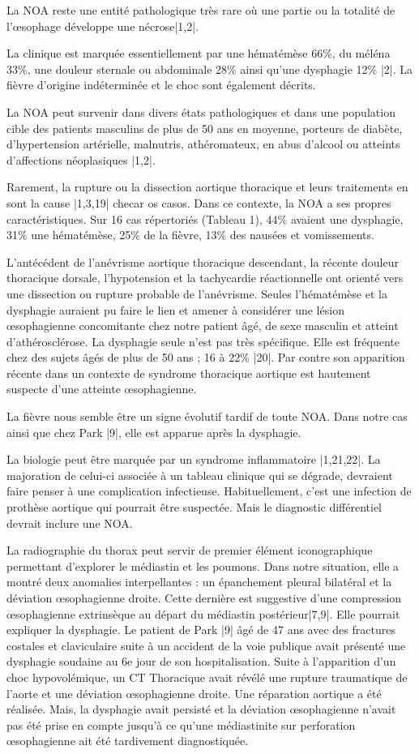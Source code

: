 \documentclass[./tfe.tex]{subfiles}
\begin{document}
La NOA reste une entité pathologique très rare où une partie ou la totalité de l’œsophage développe une nécrose|1,2|.

La clinique est marquée essentiellement par une hématémèse 66\%, du méléna 33\%, une douleur sternale ou abdominale 28\% ainsi qu’une dysphagie 12\% |2|. La fièvre d'origine indéterminée et le choc sont également décrits.

La NOA peut survenir dans divers états pathologiques et dans une population cible des patients masculins de plus de 50 ans en moyenne, porteurs de diabète, d’hypertension artérielle, malnutris, athéromateux, en abus d’alcool ou atteints d’affections néoplasiques |1,2|.

Rarement, la rupture ou la dissection aortique thoracique et leurs traitements en sont la cause |1,3,19|  checar os casos.
Dans ce contexte, la NOA a ses propres caractéristiques. Sur 16 cas répertoriés (Tableau 1), 44\% avaient une dysphagie, 31\% une hématémèse, 25\% de la fièvre, 13\% des nausées et vomissements.

L’antécédent de l’anévrisme aortique thoracique descendant, la récente douleur thoracique dorsale, l’hypotension et la tachycardie réactionnelle ont orienté vers une dissection ou rupture probable de l’anévrisme. Seules l’hématémèse et la dysphagie auraient pu faire le lien et amener à considérer une lésion œsophagienne concomitante chez notre patient âgé, de sexe masculin et atteint d’athérosclérose. La dysphagie seule n’est pas très spécifique. Elle est fréquente chez des sujets âgés de plus de 50 ans ; 16 à 22\% |20|. Par contre son apparition récente dans un contexte de syndrome thoracique aortique est hautement suspecte d’une atteinte œsophagienne.

La fièvre nous semble être un signe évolutif tardif de toute NOA. Dans notre cas ainsi que chez Park |9|, elle est apparue après la dysphagie.

La biologie peut être marquée par un syndrome inflammatoire |1,21,22|. La majoration de celui-ci associée à un tableau clinique qui se dégrade, devraient faire penser à une complication infectieuse. Habituellement, c’est une infection de prothèse aortique qui pourrait être suspectée. Mais le diagnostic différentiel devrait inclure une NOA.

La radiographie du thorax peut servir de premier élément iconographique permettant d’explorer le médiastin et les poumons. Dans notre situation, elle a montré deux anomalies interpellantes : un épanchement pleural bilatéral et la déviation œsophagienne droite. Cette dernière est suggestive d’une compression œsophagienne extrinsèque au départ du médiastin postérieur|7,9|. Elle pourrait expliquer la dysphagie. Le patient de Park |9| âgé de 47 ans avec des fractures costales et claviculaire suite à un accident de la voie publique avait présenté une dysphagie soudaine au 6e jour de son hospitalisation. Suite à l’apparition d’un choc hypovolémique, un CT Thoracique avait révélé une rupture traumatique de l’aorte et une déviation œsophagienne droite. Une réparation aortique a été réalisée. Mais, la dysphagie avait persisté et la déviation œsophagienne n’avait pas été prise en compte jusqu’à ce qu’une médiastinite sur perforation œsophagienne ait été tardivement diagnostiquée.
\end{document}
